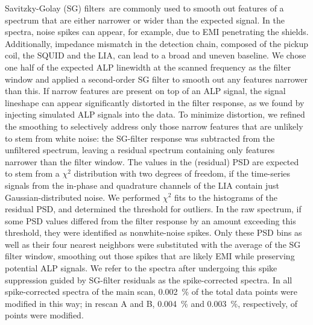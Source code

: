 \documentclass[superscriptaddress,
floatfix,
reprint,
nofootinbib,
amsmath,amssymb,
aps,
prd,
]{revtex4-2}
\begin{document}
Savitzky-Golay (SG) filters\,\cite{SavitzkyGolay} are commonly used to smooth out features of a spectrum that are either narrower or wider than the expected signal. 
In the spectra, noise spikes can appear, for example, due to EMI penetrating the shields.
Additionally, impedance mismatch in the detection chain, composed of the pickup coil, the SQUID and the LIA, can lead to a broad and uneven baseline. 
We chose one half of the expected ALP linewidth at the scanned frequency as the filter window and applied a second-order SG filter to smooth out any features narrower than this.
If narrow features are present on top of an ALP signal, the signal lineshape can appear significantly distorted in the filter response, as we found by injecting simulated ALP signals into the data.
To minimize distortion, we refined the smoothing to selectively address only those narrow features that are unlikely to stem from white noise: 
the SG-filter response was subtracted from the unfiltered spectrum, leaving a residual spectrum containing only features narrower than the filter window.
The values in the (residual) PSD are expected to stem from a $\chi^2$ distribution with two degrees of freedom, if the time-series signals from the in-phase and quadrature channels of the LIA contain just Gaussian-distributed noise.
We performed $\chi^2$ fits to the histograms of the residual PSD, and determined the threshold for outliers. 
In the raw spectrum, if some PSD values differed from the filter response by an amount exceeding this threshold, they were identified as nonwhite-noise spikes.
Only these PSD bins as well as their four nearest neighbors were substituted with the average of the SG filter window, smoothing out those spikes that are likely EMI while preserving potential ALP signals.
We refer to the spectra after undergoing this spike suppression guided by SG-filter residuals as the spike-corrected spectra.
In all spike-corrected spectra of the main scan, \SI{0.002}{\%} of the total data points were modified in this way; in rescan A and B, \SI{0.004}{\%} and \SI{0.003}{\%}, respectively, of points were modified.%
\end{document}
